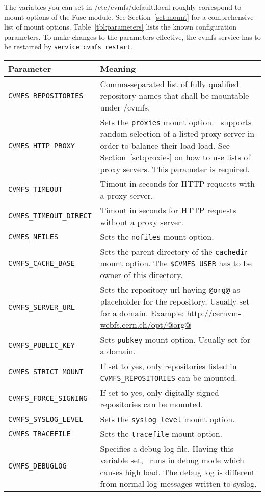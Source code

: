 The variables you can set in /etc/cvmfs/default.local roughly correspond to mount options of the Fuse module.
See Section~\ref{sct:mount} for a comprehensive list of mount options.
Table~\ref{tbl:parameters} lists the known configuration parameters.
To make changes to the parameters effective, the cvmfs service has to be restarted by \lstinline{service cvmfs restart}.
\begin{table}
	\begin{center}
		\begin{tabularx}{\linewidth}{l|X}
			{\bf\centering Parameter} & {\bf\centering Meaning} \\\hline
			\tt CVMFS\_REPOSITORIES & Comma-separated list of fully qualified repository names that shall be mountable under /cvmfs.\\
			\tt CVMFS\_HTTP\_PROXY & Sets the \texttt{proxies} mount option. \cvmfs\ supports random selection of a listed proxy server in order to balance their load load. See Section~\ref{sct:proxies} on how to use lists of proxy servers.  This parameter is required.\\
			\tt CVMFS\_TIMEOUT & Timout in seconds for HTTP requests with a proxy server.\\
			\tt CVMFS\_TIMEOUT\_DIRECT & Timout in seconds for HTTP requests without a proxy server.\\
			\tt CVMFS\_NFILES & Sets the \texttt{nofiles} mount option.\\
			\tt CVMFS\_CACHE\_BASE & Sets the parent directory of the \texttt{cachedir} mount option. The \texttt{\$CVMFS\_USER} has to be owner of this directory.\\
			\tt CVMFS\_SERVER\_URL & Sets the repository url having \texttt{@org@} as placeholder for the repository. Usually set for a domain. Example: \url{http://cernvm-webfs.cern.ch/opt/@org@} \\
			\tt CVMFS\_PUBLIC\_KEY & Sets \texttt{pubkey} mount option.  Usually set for a domain. \\
			\tt CVMFS\_STRICT\_MOUNT & If set to yes, only repositories listed in \texttt{CVMFS\_REPOSITORIES} can be mounted. \\
			\tt CVMFS\_FORCE\_SIGNING & If set to yes, only digitally signed repositories can be mounted. \\
			\tt CVMFS\_SYSLOG\_LEVEL & Sets the \texttt{syslog\_level} mount option. \\
			\tt CVMFS\_TRACEFILE & Sets the \texttt{tracefile} mount option.\\
			\tt CVMFS\_DEBUGLOG & Specifies a debug log file.  Having this variable set, \cvmfs\ runs in debug mode which causes high load.  The debug log is different from normal log messages written to syslog.\\

\end{tabularx}
\end{center}
\end{table}
